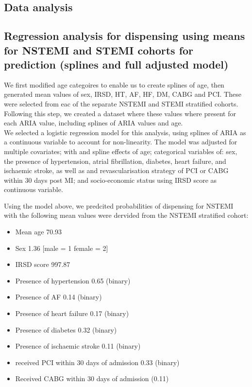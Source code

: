 \documentclass[11pt]{article}
\begin{document}
\subsection{Data analysis}
\subsection{Regression analysis for dispensing using means for NSTEMI and STEMI cohorts for prediction (splines and full adjusted model)}
We first modified age categoires to enable us to create splines of age, then generated mean values of sex, IRSD, HT, AF, HF, DM, CABG and PCI. These were selected from eac of the separate NSTEMI and STEMI stratified cohorts. Following this step, we created a dataset where these values where present for each ARIA value, including splines of ARIA values and age.\\
We selected a logistic regression model for this analysis, using splines of ARIA as a continuous variable to account for non-linearity. The model was adjusted for multiple covariates; with and spline effects of age; categorical variables of: sex, the presence of hypertension, atrial fibrillation, diabetes, heart failure, and ischaemic stroke, as well as and revascularisation strategy of PCI or CABG within 30 days post MI; and socio-economic status using IRSD score as continuous variable. \\
\color{violet}
\begin{stlog}\end{stlog}
\color{black}
Using the model above, we predcited probabilities of dispensing for NSTEMI with the following mean values were dervided from the NSTEMI stratified cohort: \\
\begin{itemize}
\item Mean age 70.93
\item Sex 1.36 [male = 1 female = 2]
\item IRSD score 997.87
\item Presence of hypertension 0.65 (binary)
\item Presence of AF 0.14 (binary)
\item Presence of heart failure 0.17 (binary)
\item Presence of diabetes 0.32 (binary)
\item Presence of ischaemic stroke 0.11 (binary)
\item received PCI within 30 days of admission 0.33 (binary)
\item Received CABG within 30 days of admission (0.11)
\end{itemize}
\end{document}
